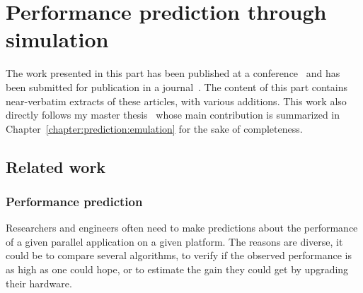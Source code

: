 \part{Performance prediction through simulation}
\label{part:prediction}

The work presented in this part has been published at a conference~\cite{cornebize:cluster19} and has been submitted
for publication in a journal~\cite{cornebize:jpdc}. The content of this part contains near-verbatim extracts of these
articles, with various additions. This work also directly follows my master thesis~\cite{cornebize:master_thesis} whose
main contribution is summarized in Chapter~\ref{chapter:prediction:emulation} for the sake of completeness.

\chapter{Related work}%
\label{chapter:prediction:related_work}


    \section{Performance prediction}%
    \label{sec:performance_prediction}

        Researchers and engineers often need to make predictions about the performance of a given parallel application
        on a given platform. The reasons are diverse, it could be to compare several algorithms, to verify if the
        observed performance is as high as one could hope, or to estimate the gain they could get by upgrading their
        hardware.


